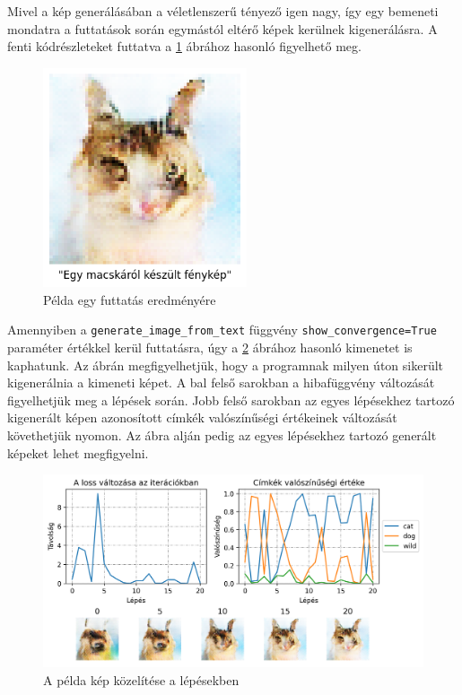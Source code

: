 Mivel a kép generálásában a véletlenszerű tényező igen nagy, így egy bemeneti mondatra a futtatások során egymástól eltérő képek kerülnek kigenerálásra. A fenti kódrészleteket futtatva a \ref{fig:demo} ábrához hasonló figyelhető meg.

\begin{figure}[h]
	\centering
	\includegraphics[width=6cm]{images/demo01.png}
	\caption{Példa egy futtatás eredményére}
	\label{fig:demo}
\end{figure}

Amennyiben a \texttt{generate\_image\_from\_text} függvény \texttt{show\_convergence=True} paraméter értékkel kerül futtatásra, úgy a \ref{fig:demo_convergence} ábrához hasonló kimenetet is kaphatunk. Az ábrán megfigyelhetjük, hogy a programnak milyen úton sikerült kigenerálnia a kimeneti képet. A bal felső sarokban a hibafüggvény változását figyelhetjük meg a lépések során. Jobb felső sarokban az egyes lépésekhez tartozó kigenerált képen azonosított címkék valószínűségi értékeinek változását követhetjük nyomon. Az ábra alján pedig az egyes lépésekhez tartozó generált képeket lehet megfigyelni.

\begin{figure}[h]
	\centering
	\includegraphics[width=15cm]{images/demo01_conv.png}
	\caption{A példa kép közelítése a lépésekben}
	\label{fig:demo_convergence}
\end{figure}

